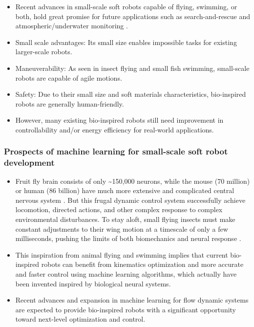 \documentclass[12pt, a4paper]{article}
\providecommand{\tightlist}{%
  \setlength{\itemsep}{0pt}\setlength{\parskip}{0pt}}
\begin{document}
\begin{itemize}
\item
  Recent advances in small-scale soft robots capable of flying,
  swimming, or both, hold great promise for future applications such as
  search-and-rescue and atmospheric/underwater monitoring
  \citep[\citet{Aubin2019},\citet{Chen2017}]{Jafferis2019}.
\item
  Small scale advantages: Its small size enables impossible tasks for
  existing larger-scale robots.
\item
  Maneuverability: As seen in insect flying and small fish swimming,
  small-scale robots are capable of agile motions.
\item
  Safety: Due to their small size and soft materials characteristics,
  bio-inspired robots are generally human-friendly.
\item
  However, many existing bio-inspired robots still need improvement in
  controllability and/or energy efficiency for real-world applications.
\end{itemize}

\hypertarget{prospects-of-machine-learning-for-small-scale-soft-robot-development}{%
\subsubsection{Prospects of machine learning for small-scale soft robot
development}\label{prospects-of-machine-learning-for-small-scale-soft-robot-development}}

\begin{itemize}
\tightlist
\item
  Fruit fly brain consists of only \textasciitilde150,000 neurons, while
  the mouse (70 million) or human (86 billion) have much more extensive
  and complicated central nervous system \citep{Webb2020}. But this
  frugal dynamic control system successfully achieve locomotion,
  directed actions, and other complex response to complex environmental
  disturbances. To stay aloft, small flying insects must make constant
  adjustments to their wing motion at a timescale of only a few
  milliseconds, pushing the limits of both biomechanics and neural
  response \citep{Cohen2019}.
\item
  This inspiration from animal flying and swimming implies that current
  bio-inspired robots can benefit from kinematics optimization and more
  accurate and faster control using machine learning algorithms, which
  actually have been invented inspired by biological neural systems.
\item
  Recent advances and expansion in machine learning for flow dynamic
  systems are expected to provide bio-inspired robots with a significant
  opportunity toward next-level optimization and control.
\end{itemize}
\end{document}
